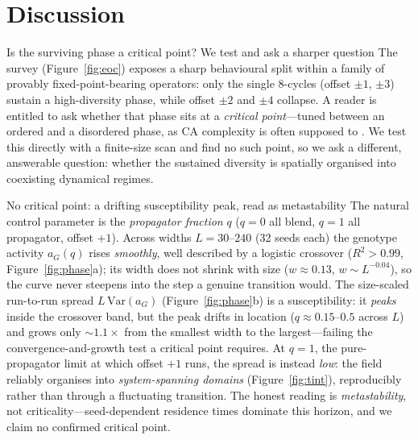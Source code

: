 \documentclass[man,12pt,floatsintext]{apa7}
\begin{document}
\section{Discussion}
\label{sec:discussion}

\begin{expositionbox}{Is the surviving phase a critical point? We test and ask a sharper question}
The survey (Figure~\ref{fig:eoc}) exposes a sharp behavioural split within a
family of provably fixed-point-bearing operators: only the single 8-cycles
(offset $\pm 1$, $\pm 3$) sustain a high-diversity phase, while offset $\pm 2$ and
$\pm 4$ collapse. A reader is entitled to ask whether that phase sits at a
\emph{critical point}---tuned between an ordered and a disordered phase, as CA
complexity is often supposed to \parencite{langton1990computation}. We test this
directly with a finite-size scan and find no such point, so we ask a different,
answerable question: whether the sustained diversity is spatially organised into
coexisting dynamical regimes.
\end{expositionbox}

\begin{empiricalfinding}[label={find:crossover}]{No critical point: a drifting susceptibility peak, read as metastability}
The natural control parameter is the \emph{propagator fraction} $q$ ($q = 0$ all
blend, $q = 1$ all propagator, offset $+1$). Across widths $L = 30$--$240$ (32
seeds each) the genotype activity $a_G(q)$ rises \emph{smoothly}, well described
by a logistic crossover ($R^2 > 0.99$, Figure~\ref{fig:phase}a); its width does
not shrink with size ($w \approx 0.13$, $w \sim L^{-0.04}$), so the curve never
steepens into the step a genuine transition would. The size-scaled run-to-run
spread $L\,\mathrm{Var}(a_G)$ (Figure~\ref{fig:phase}b) is a susceptibility: it
\emph{peaks} inside the crossover band, but the peak drifts in location
($q \approx 0.15$--$0.5$ across $L$) and grows only ${\sim}1.1\times$ from the
smallest width to the largest---failing the convergence-and-growth test a
critical point requires. At $q = 1$, the pure-propagator limit at which offset
$+1$ runs, the spread is instead \emph{low}: the field reliably organises into
\emph{system-spanning domains} (Figure~\ref{fig:tint}), reproducibly rather than
through a fluctuating transition. The honest reading is \emph{metastability}, not
criticality---seed-dependent residence times dominate this horizon, and we claim
no confirmed critical point.
\end{empiricalfinding}
\end{document}
